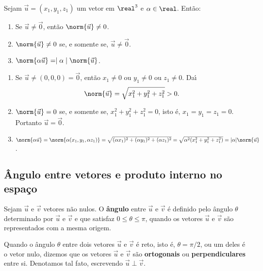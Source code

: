 \begin{proposicao}
  Sejam $\vec{u} = (x_1, y_1,z_1)$ um vetor em $\real^3$ e $\alpha \in \real$. Ent\~ao:
  \begin{enumerate}
    \item Se $\vec{u} \ne \vec{0}$, ent\~ao $\norm{\vec{u}} \ne 0$.
    \item $\norm{\vec{u}} \ne 0$ se, e somente se, $\vec{u} \ne \vec{0}$.
    \item $\norm{\alpha\vec{u}} = \mid\alpha\mid\norm{\vec{u}}$.
  \end{enumerate}
\end{proposicao}
\begin{prova}
  \begin{enumerate}
    \item  Se $\vec{u} \ne (0,0,0) = \vec{0}$, ent\~ao $x_1 \ne 0$ ou $y_1 \ne 0$ ou $z_1 \ne 0$. Da{\'\i}
    \[
      \norm{\vec{u}} = \sqrt{x_1^2 + y_1^2 + z_1^2} > 0.
    \]
    \item $\norm{\vec{u}} = 0$ se, e somente se, $x_1^2 + y_1^2 + z_1^2 = 0$, isto \'e, $x_1 = y_1 = z_1 = 0$. Portanto $\vec{u} = \vec{0}$.
    \item $\norm{\alpha\vec{u}} = \norm{\alpha(x_1, y_1, \alpha z_1)} = \sqrt{(\alpha x_1)^2 + (\alpha y_1)^2 + (\alpha z_1)^2} = \sqrt{\alpha^2(x_1^2 + y_1^2 + z_1^2)} = |\alpha|\norm{\vec{u}}$.
  \end{enumerate}
\end{prova}

\subsection{\^Angulo entre vetores e produto interno no espa\c{c}o} %
\label{sub:angulo_entre_vetores_e_produto_interno_no_espaco}
\begin{definicao}
  Sejam $\vec{u}$ e $\vec{v}$ vetores n\~ao nulos. O \textbf{\^angulo} entre $\vec{u}$ e $\vec{v}$ \'e definido pelo \^angulo $\theta$ determinado por $\vec{u}$ e $\vec{v}$ e que satisfaz $0 \le \theta \le \pi$, quando os vetores $\vec{u}$ e $\vec{v}$ s\~ao representados com a mesma origem.
\end{definicao}

\begin{definicao}
  Quando o \^angulo $\theta$ entre dois vetores $\vec{u}$ e $\vec{v}$ \'e reto, isto \'e, $\theta = \pi/2$, ou um deles \'e o vetor nulo, dizemos que os vetores $\vec{u}$ e $\vec{v}$ s\~ao \textbf{ortogonais} ou \textbf{perpendiculares} entre si. Denotamos tal fato, escrevendo $\vec{u} \perp \vec{v}$.
\end{definicao}

